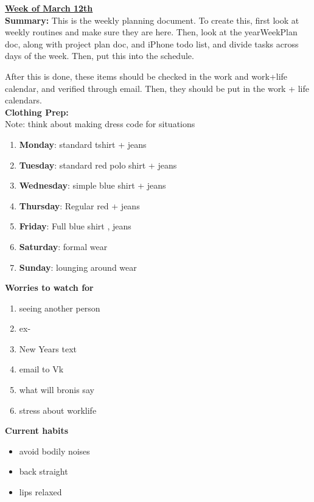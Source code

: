 


{\huge{\underline{\textbf{Week of March 12th}}}} \\

\textbf{Summary:} This is the weekly planning document. To create
this, first look at weekly routines and make sure they are here. Then,
look at the yearWeekPlan doc, along with project plan doc, and iPhone
todo list, and divide tasks across days of the week. Then, put this
into the schedule.

After this is done, these items should be checked in the work and
work+life calendar, and verified through email.
Then, they should be put in the work + life
calendars. \\

\textbf{Clothing Prep: } \\
Note: think about making dress code for situations
\begin{enumerate}
\item \textbf{Monday}: standard tshirt + jeans
\item \textbf{Tuesday}: standard red polo shirt + jeans
\item \textbf{Wednesday}: simple  blue shirt + jeans
\item \textbf{Thursday}: Regular red + jeans
\item \textbf{Friday}: Full blue shirt , jeans
\item \textbf{Saturday}: formal wear
\item \textbf{Sunday}: lounging around wear
\end{enumerate}

\textbf{Worries to watch for} \\
\begin{enumerate}
\item seeing another person
\item ex-
\item New Years text
\item email to Vk
\item what will bronis say
\item stress about worklife
\end{enumerate}

\textbf{Current habits}\\
\begin{itemize}
\item avoid bodily noises
\item back straight
\item lips relaxed
\end{itemize}

